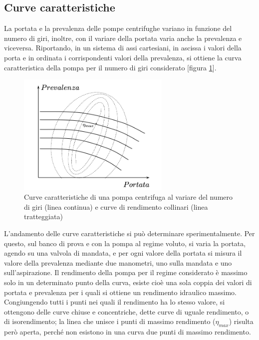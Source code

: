 \documentclass[laurea,oneside,11pt]{USiena_tesiLM}
\begin{document}
\subsection{Curve caratteristiche}
La portata e la prevalenza delle pompe centrifughe variano in funzione del numero di giri, inoltre, con il variare della portata varia anche la prevalenza e viceversa. Riportando, in un sistema di assi cartesiani, in ascissa i valori della porta e in ordinata i corrispondenti valori della prevalenza, si ottiene la curva caratteristica della pompa per il numero di giri considerato [figura \ref{fig:curve_car}].

\begin{figure}[!ht]
\centering
\includegraphics[width=0.65\textwidth]{figure/curve_car} 
\caption{Curve caratteristiche di una pompa centrifuga al variare del numero di giri (linea continua) e curve di rendimento collinari (linea tratteggiata)}
\label{fig:curve_car}
\end{figure}

L'andamento delle curve caratteristiche si può determinare sperimentalmente.
Per questo, sul banco di prova e con la pompa al regime voluto, si varia la portata, agendo
su una valvola di mandata, e per ogni valore della portata si misura il valore della
prevalenza mediante due manometri, uno sulla mandata e uno sull'aspirazione.
Il rendimento della pompa per il regime considerato è massimo solo in un determinato
punto della curva, esiste cioè una sola coppia dei valori di portata e prevalenza per i quali si ottiene
un rendimento idraulico massimo.
Congiungendo tutti i punti nei quali il rendimento ha lo stesso valore, si ottengono delle curve chiuse e concentriche, dette curve di uguale rendimento, o di isorendimento; la linea che unisce i punti di massimo rendimento ($\eta_{max}$) risulta però aperta, perché non esistono in una curva due punti di massimo rendimento.
\end{document}
